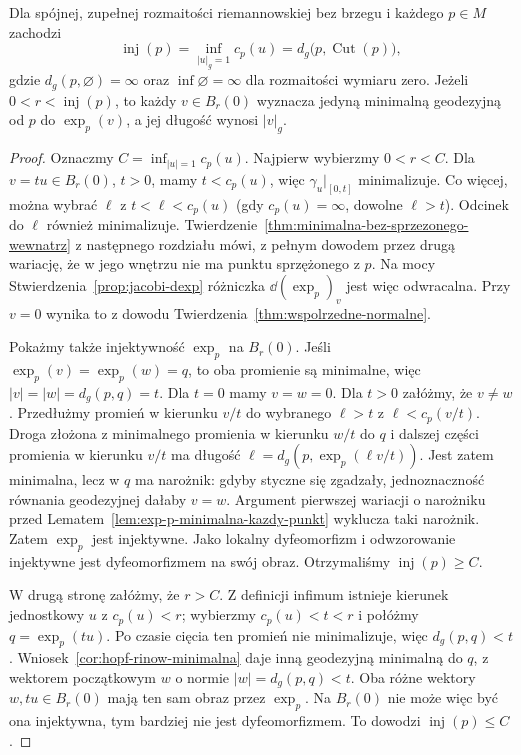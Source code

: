 \begin{twierdzenie}
\label{thm:ciecie-promien-injektywnosci}
Dla spójnej, zupełnej rozmaitości riemannowskiej bez brzegu
i każdego $p\in M$ zachodzi
\begin{equation}\label{eq:inj-inf-ciecie}
 \operatorname{inj}(p)
 =\inf_{|u|_g=1}c_p(u)
 =d_g\bigl(p,\operatorname{Cut}(p)\bigr),
\end{equation}
 gdzie $d_g(p,\varnothing)=\infty$ oraz
 $\inf\varnothing=\infty$ dla rozmaitości wymiaru zero.
Jeżeli $0<r<\operatorname{inj}(p)$, to każdy
$v\in B_r(0)$ wyznacza jedyną minimalną geodezyjną
od $p$ do $\exp_p(v)$, a jej długość wynosi $|v|_g$.
\end{twierdzenie}
\begin{proof}
Oznaczmy $C=\inf_{|u|=1}c_p(u)$.
Najpierw wybierzmy $0<r<C$.
Dla $v=tu\in B_r(0)$, $t>0$, mamy $t<c_p(u)$,
więc $\gamma_u|_{[0,t]}$ minimalizuje. Co więcej,
można wybrać $\ell$ z $t<\ell<c_p(u)$
(gdy $c_p(u)=\infty$, dowolne $\ell>t$).
Odcinek do $\ell$ również minimalizuje.
Twierdzenie~\ref{thm:minimalna-bez-sprzezonego-wewnatrz}
z następnego rozdziału mówi, z pełnym dowodem przez
drugą wariację, że w jego wnętrzu nie ma punktu
sprzężonego z $p$. Na mocy
Stwierdzenia~\ref{prop:jacobi-dexp} różniczka
$\dd(\exp_p)_v$ jest więc odwracalna.
Przy $v=0$ wynika to z dowodu
Twierdzenia~\ref{thm:wspolrzedne-normalne}.

Pokażmy także injektywność $\exp_p$ na $B_r(0)$.
Jeśli $\exp_p(v)=\exp_p(w)=q$, to oba promienie
są minimalne, więc $|v|=|w|=d_g(p,q)=t$.
Dla $t=0$ mamy $v=w=0$. Dla $t>0$ załóżmy,
że $v\ne w$. Przedłużmy promień w kierunku $v/t$
do wybranego $\ell>t$ z $\ell<c_p(v/t)$.
Droga złożona z minimalnego promienia w kierunku $w/t$
do $q$ i dalszej części promienia w kierunku $v/t$
ma długość $\ell=d_g(p,\exp_p(\ell v/t))$.
Jest zatem minimalna, lecz w $q$ ma narożnik:
gdyby styczne się zgadzały, jednoznaczność równania
geodezyjnej dałaby $v=w$. Argument pierwszej wariacji
o narożniku przed Lematem~\ref{lem:exp-p-minimalna-kazdy-punkt}
wyklucza taki narożnik. Zatem $\exp_p$ jest injektywne.
Jako lokalny dyfeomorfizm i odwzorowanie injektywne
jest dyfeomorfizmem na swój obraz. Otrzymaliśmy
$\operatorname{inj}(p)\geq C$.

W drugą stronę załóżmy, że $r>C$.
Z definicji infimum istnieje kierunek jednostkowy
$u$ z $c_p(u)<r$; wybierzmy
$c_p(u)<t<r$ i połóżmy $q=\exp_p(tu)$.
Po czasie cięcia ten promień nie minimalizuje,
więc $d_g(p,q)<t$. Wniosek~\ref{cor:hopf-rinow-minimalna}
daje inną geodezyjną minimalną do $q$,
z wektorem początkowym $w$ o normie
$|w|=d_g(p,q)<t$. Oba różne wektory
$w,tu\in B_r(0)$ mają ten sam obraz przez $\exp_p$.
Na $B_r(0)$ nie może więc być ona injektywna,
tym bardziej nie jest dyfeomorfizmem.
To dowodzi $\operatorname{inj}(p)\leq C$.


\end{proof}
